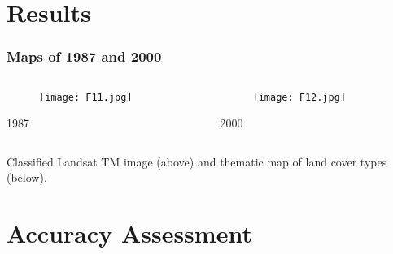 \documentclass[pdflatex,compress,8pt,
	xcolor={dvipsnames,dvipsnames,svgnames,x11names,table},
	hyperref={
	breaklinks = true, 
	pdfauthor={Lemenkova Polina}, 
	pdfsubject={Preentation}, 
	pdfcreator={Lemenkova Polina}, 
	pdfproducer={Lemenkova Polina}, 
	citecolor=NavyBlue, 
	urlbordercolor=cyan,
	urlcolor = NavyBlue, 
	breaklinks = true}]{beamer}
\begin{document}
\section{Results}
\begin{frame}\frametitle{Maps of 1987 and 2000}
\begin{minipage}[0.4\textheight]{\textwidth}
\begin{columns}[T]
\begin{column}{0.5\textwidth}
\begin{figure}[H]
	\centering
		\texttt{[image: F11.jpg]}
\end{figure}
\small{1987}
\end{column}
\begin{column}{0.5\textwidth}
\begin{figure}[H]
	\centering
		\texttt{[image: F12.jpg]}
\end{figure}
\small{2000}
\end{column}
\end{columns}
\end{minipage}
Classified Landsat TM image (above) and thematic map of land cover types (below).
\end{frame}

\section{Accuracy Assessment}
\end{document}
